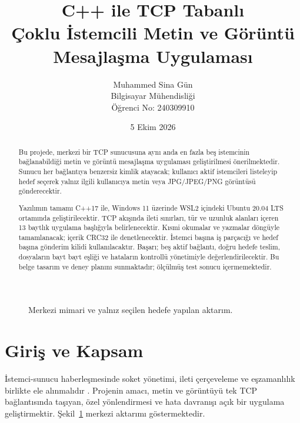 \documentclass[12pt,oneside,a4paper]{article}
\title{
    C++ ile TCP Tabanlı\\
    Çoklu İstemcili Metin ve Görüntü\\
    Mesajlaşma Uygulaması
}
\author{
    Muhammed Sina Gün\\
    Bilgisayar Mühendisliği\\
    Öğrenci No: 240309910
}
\date{5 Ekim 2026}
\begin{document}

\maketitle
\thispagestyle{fancy}

\begin{abstract}
Bu projede, merkezi bir TCP sunucusuna aynı anda en fazla beş
istemcinin bağlanabildiği metin ve görüntü mesajlaşma uygulaması
geliştirilmesi önerilmektedir. Sunucu her bağlantıya benzersiz
kimlik atayacak; kullanıcı aktif istemcileri listeleyip hedef
seçerek yalnız ilgili kullanıcıya metin veya JPG/JPEG/PNG
görüntüsü gönderecektir.

Yazılımın tamamı C++17 ile, Windows 11 üzerinde WSL2 içindeki
Ubuntu 20.04 LTS ortamında geliştirilecektir. TCP akışında ileti
sınırları, tür ve uzunluk alanları içeren 13 baytlık uygulama
başlığıyla belirlenecektir. Kısmi okumalar ve yazmalar döngüyle
tamamlanacak; içerik CRC32 ile denetlenecektir. İstemci başına iş
parçacığı ve hedef başına gönderim kilidi kullanılacaktır.
Başarı; beş aktif bağlantı, doğru hedefe teslim, dosyaların bayt
bayt eşliği ve hataların kontrollü yönetimiyle değerlendirilecektir.
Bu belge tasarım ve deney planını sunmaktadır; ölçülmüş test
sonucu içermemektedir.
\end{abstract}

\begin{figure}[H]
\centering
{}
\caption{Merkezi mimari ve yalnız seçilen hedefe yapılan aktarım.}
\label{fig:architecture}
\end{figure}

\clearpage
\section{Giriş ve Kapsam}
İstemci-sunucu haberleşmesinde soket yönetimi, ileti çerçeveleme
ve eşzamanlılık birlikte ele alınmalıdır \cite{tanenbaum,kurose}.
Projenin amacı, metin ve görüntüyü tek TCP bağlantısında taşıyan,
özel yönlendirmesi ve hata davranışı açık bir uygulama geliştirmektir.
Şekil~\ref{fig:architecture} merkezi aktarımı göstermektedir.
\end{document}
